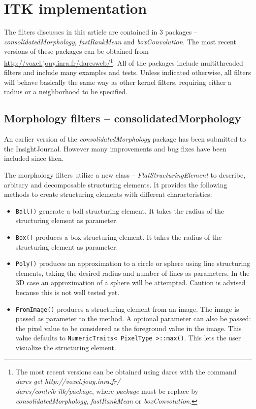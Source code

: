 \documentclass{InsightArticle}
\begin{document}
\section{ITK implementation}
The filters discusses in this article are contained in 3 packages --
{\em consolidatedMorphology}, {\em fastRankMean} and {\em
boxConvolution}. The most recent versions of these packages can be
obtained from \url{http://voxel.jouy.inra.fr/darcsweb/}\footnote{
The most recent versions can be obtained using darcs \cite{DarcsWebSite}
with the command {\em darcs get http://voxel.jouy.inra.fr/\\darcs/contrib-itk/package},
where {\em package} must be replace by {\em consolidatedMorphology},
{\em fastRankMean} or {\em boxConvolution}.}.
All of the packages
include multithreaded filters and include many examples and tests. Unless
indicated otherwise, all filters will behave basically the same way as
other kernel filters, requiring either a radius or a neighborhood to
be specified.

\subsection{Morphology filters -- consolidatedMorphology}
An earlier version of the {\em consolidatedMorphology} package has
been submitted to the InsightJournal. However many improvements and
bug fixes have been included since then.

The morphology filters utilize a new class -- {\em
FlatStructuringElement} to describe, arbitary and decomposable
structuring elements. It provides the following methods to create
structuring elements with different characteristics:
\begin{itemize}
  \item \verb$Ball()$ generate a ball structuring element. It takes the 
	radius of the structuring element as parameter.
  \item \verb$Box()$ produces a box structuring element. It takes the radius 
	of the structuring element as parameter.
  \item \verb$Poly()$ produces an approximation to a circle or sphere using 
	line structuring elements, taking the desired radius and number of 
	lines as parameters. In the 3D case an approximation of a sphere will 
	be attempted. Caution is advised because this is not well tested yet.
  \item \verb$FromImage()$ produces a structuring element from an image. The image is passed
as parameter to the method. A optional parameter can also be passed: the pixel value
to be considered as the foreground value in the image. This value defaults to
\verb$NumericTraits< PixelType >::max()$. This lets the user visualize the structuring element.
\end{itemize}
\end{document}
